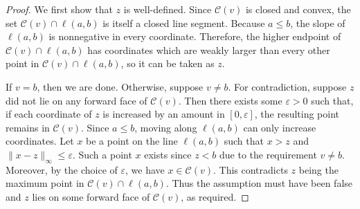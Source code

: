 \documentclass[11pt]{article}
\begin{document}
\lemhelpdefinitionspine*
\begin{proof}
    We first show that $z$ is well-defined. Since $\mathcal{C}(v)$ is closed and convex, the set $\mathcal{C}(v) \cap \ell(a, b)$ is itself a closed line segment. Because $a \leq b$, the slope of $\ell(a, b)$ is nonnegative in every coordinate. Therefore, the higher endpoint of $\mathcal{C}(v) \cap \ell(a, b)$ has coordinates which are weakly larger than every other point in $\mathcal{C}(v) \cap \ell(a, b)$, so it can be taken as $z$.

    If $v=b$, then we are done. Otherwise, suppose $v \neq b$.
    For contradiction, suppose $z$ did not lie on any forward face of $\mathcal{C}(v)$. Then there exists some $\varepsilon > 0$ such that, if each coordinate of $z$ is increased by an amount in $[0, \varepsilon]$, the resulting point remains in $\mathcal{C}(v)$. 
    Since $a \leq b$, moving along $\ell(a, b)$ can only increase coordinates. 
Let $x$ be  a point on the line $\ell(a, b)$ such that $x > z$ and $ \|x-z\|_{\infty} \leq \varepsilon$. Such a point $x$ exists since $z < b$ due to the requirement $v \neq b$. Moreover, by the choice of $\varepsilon$, we have $x \in \mathcal{C}(v)$. This contradicts $z$ being the maximum point in $\mathcal{C}(v) \cap \ell(a, b)$.
    Thus the assumption must have been false and  $z$ lies on some forward face of $\mathcal{C}(v)$, as required.
\end{proof}
\end{document}
